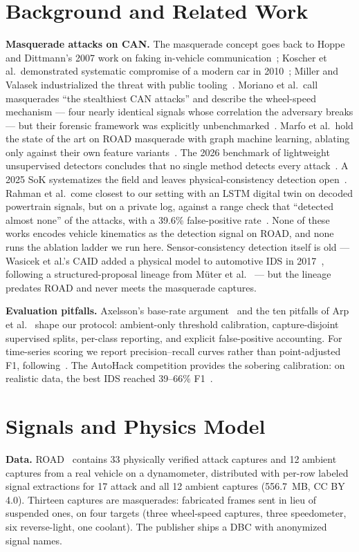 \documentclass[10pt,twocolumn]{article}
\begin{document}
\section{Background and Related Work}
\textbf{Masquerade attacks on CAN.} The masquerade concept goes back to Hoppe and Dittmann's 2007 work on faking in-vehicle communication~\cite{hoppe2007}; Koscher et al.\ demonstrated systematic compromise of a modern car in 2010~\cite{koscher2010}; Miller and Valasek industrialized the threat with public tooling~\cite{miller2013}. Moriano et al.\ call masquerades ``the stealthiest CAN attacks'' and describe the wheel-speed mechanism --- four nearly identical signals whose correlation the adversary breaks --- but their forensic framework was explicitly unbenchmarked~\cite{moriano2022}. Marfo et al.\ hold the state of the art on ROAD masquerade with graph machine learning, ablating only against their own feature variants~\cite{marfo2025}. The 2026 benchmark of lightweight unsupervised detectors concludes that no single method detects every attack~\cite{moriano2026}. A 2025 SoK systematizes the field and leaves physical-consistency detection open~\cite{serag2025}. Rahman et al.\ come closest to our setting with an LSTM digital twin on decoded powertrain signals, but on a private log, against a range check that ``detected almost none'' of the attacks, with a 39.6\% false-positive rate~\cite{rahman2026}. None of these works encodes vehicle kinematics as the detection signal on ROAD, and none runs the ablation ladder we run here. Sensor-consistency detection itself is old --- Wasicek et al.'s CAID added a physical model to automotive IDS in 2017~\cite{wasicek2017}, following a structured-proposal lineage from M\"uter et al.~\cite{muter2010} --- but the lineage predates ROAD and never meets the masquerade captures.

\textbf{Evaluation pitfalls.} Axelsson's base-rate argument~\cite{axelsson2000} and the ten pitfalls of Arp et al.~\cite{arp2022} shape our protocol: ambient-only threshold calibration, capture-disjoint supervised splits, per-class reporting, and explicit false-positive accounting. For time-series scoring we report precision--recall curves rather than point-adjusted F1, following~\cite{tatbul2018,kim2022}. The AutoHack competition provides the sobering calibration: on realistic data, the best IDS reached 39--66\% F1~\cite{song2026}.

\section{Signals and Physics Model}
\textbf{Data.} ROAD~\cite{verma2024,road2020} contains 33 physically verified attack captures and 12 ambient captures from a real vehicle on a dynamometer, distributed with per-row labeled signal extractions for 17 attack and all 12 ambient captures (556.7~MB, CC BY 4.0). Thirteen captures are masquerades: fabricated frames sent in lieu of suspended ones, on four targets (three wheel-speed captures, three speedometer, six reverse-light, one coolant). The publisher ships a DBC with anonymized signal names.
\end{document}
